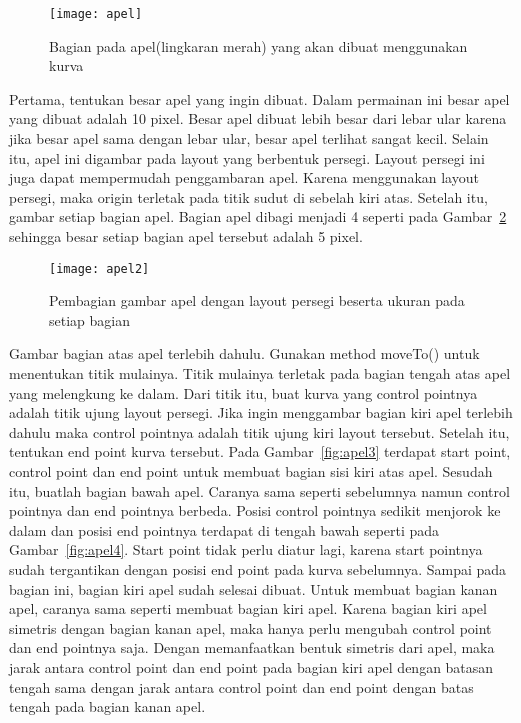 \begin{figure}[H]
	\centering  
	\texttt{[image: apel]}  
	\caption[Bagian pada apel(lingkaran merah) yang akan dibuat menggunakan kurva]{Bagian pada apel(lingkaran merah) yang akan dibuat menggunakan kurva}
	\label{fig:apel} 
\end{figure}

Pertama, tentukan besar apel yang ingin dibuat. Dalam permainan ini besar apel yang dibuat adalah 10 pixel. Besar apel dibuat lebih besar dari lebar ular karena jika besar apel sama dengan lebar ular, besar apel terlihat sangat kecil. Selain itu, apel ini digambar pada layout yang berbentuk persegi. Layout persegi ini juga dapat mempermudah penggambaran apel. Karena menggunakan layout persegi, maka origin terletak pada titik sudut di sebelah kiri atas. Setelah itu, gambar setiap bagian apel. Bagian apel dibagi menjadi 4 seperti pada Gambar~\ref{fig:apel2} sehingga besar setiap bagian apel tersebut adalah 5 pixel. 

\begin{figure}[H]
	\centering  
	\texttt{[image: apel2]}  
	\caption[Pembagian gambar apel dengan layout persegi beserta ukuran pada setiap bagian]{Pembagian gambar apel dengan layout persegi beserta ukuran pada setiap bagian}
	\label{fig:apel2} 
\end{figure}

Gambar bagian atas apel terlebih dahulu. Gunakan method moveTo() untuk menentukan titik mulainya. Titik mulainya terletak pada bagian tengah atas apel yang melengkung ke dalam. Dari titik itu, buat kurva yang control pointnya adalah titik ujung layout persegi. Jika ingin menggambar bagian kiri apel terlebih dahulu maka control pointnya adalah titik ujung kiri layout tersebut. Setelah itu, tentukan end point kurva tersebut. Pada Gambar~\ref{fig:apel3} terdapat start point, control point dan end point untuk membuat bagian sisi kiri atas apel. Sesudah itu, buatlah bagian bawah apel. Caranya sama seperti sebelumnya namun control pointnya dan end pointnya berbeda. Posisi control pointnya sedikit menjorok ke dalam dan posisi end pointnya terdapat di tengah bawah seperti pada Gambar~\ref{fig:apel4}. Start point tidak perlu diatur lagi, karena start pointnya sudah tergantikan dengan posisi end point pada kurva sebelumnya. Sampai pada bagian ini, bagian kiri apel sudah selesai dibuat. Untuk membuat bagian kanan apel, caranya sama seperti membuat bagian kiri apel. Karena bagian kiri apel simetris dengan bagian kanan apel, maka hanya perlu mengubah control point dan end pointnya saja. Dengan memanfaatkan bentuk simetris dari apel, maka jarak antara control point dan end point pada bagian kiri apel dengan batasan tengah sama dengan jarak antara control point dan end point dengan batas tengah pada bagian kanan apel. 

